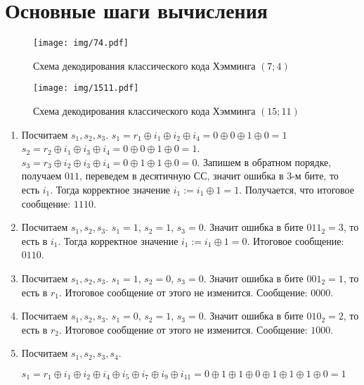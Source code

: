 \section{Основные шаги вычисления}

\begin{figure}
    \centering
    \texttt{[image: img/74.pdf]}
    \caption{Схема декодирования классического кода Хэмминга $(7; 4)$}
\end{figure}

\begin{figure}
    \centering
    \texttt{[image: img/1511.pdf]}
    \caption{Схема декодирования классического кода Хэмминга $(15; 11)$}
\end{figure}


\begin{enumerate}
    \item Посчитаем $s_1, s_2, s_3$. $s_1 = r_1 \oplus i_1 \oplus i_2 \oplus i_4 = 0 \oplus 0 \oplus 1 \oplus 0 = 1$
    $s_2 = r_2 \oplus i_1 \oplus i_3 \oplus i_4 = 0 \oplus 0 \oplus 1 \oplus 0 = 1$.
    $s_3 = r_3 \oplus i_2 \oplus i_3 \oplus i_4 = 0 \oplus 1 \oplus 1 \oplus 0 = 0$.
    Запишем в обратном порядке, получаем $011$, переведем в десятичную СС, значит ошибка в 3-м бите, то есть $i_1$.
    Тогда корректное значение $i_1 := i_1 \oplus 1 = 1$.
    Получается, что итоговое сообщение: $1110$.

    \item Посчитаем $s_1, s_2, s_3$. $s_1 = 1$, $s_2 = 1$, $s_3= 0$. Значит ошибка
    в бите $011_2 = 3$, то есть в $i_1$. Тогда корректное значение $i_1 := i_1 \oplus 1 = 0$.
    Итоговое сообщение: $0110$.

    \item Посчитаем $s_1, s_2, s_3$. $s_1 = 1$, $s_2 = 0$, $s_3 = 0$. Значит ошибка в
    бите $001_2 = 1$, то есть в $r_1$. Итоговое сообщение от этого не изменится.
    Сообщение: $0000$.

    \item Посчитаем $s_1, s_2, s_3$. $s_1 = 0$, $s_2 = 1$, $s_3 = 0$. Значит ошибка в
    бите $010_2 = 2$, то есть в $r_2$. Итоговое сообщение от этого не изменится.
    Сообщение: $1000$.

    \item Посчитаем $s_1, s_2, s_3, s_4$.
    
    $s_1 = r_1 \oplus i_1 \oplus i_2 \oplus i_4 \oplus i_5 \oplus i_7 \oplus i_9 \oplus i_{11} =
    0 \oplus 1 \oplus 1 \oplus 0 \oplus 1 \oplus 1 \oplus 1 \oplus 0 = 1
    $


\end{enumerate}
